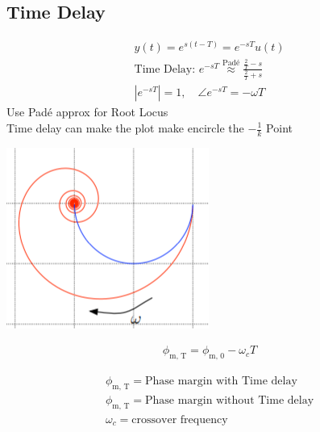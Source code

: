 \subsection{Time Delay}
    \begin{minipage}{0.59\linewidth}
        \begin{align*}
            y(t) = e^{s(t-T)} = e^{-sT} u(t)\\
            \text{Time Delay: } e^{-sT} \overset{\text{Padé}}{\approx} \frac{\frac{2}{T} - s}{\frac{2}{T} + s}\\
            |e^{-sT}| = 1, \quad \angle e^{-sT} = - \omega T
        \end{align*}
        Use Padé approx for Root Locus\\
        Time delay can make the plot make encircle the $-\frac{1}{k}$ Point
    \end{minipage}
    \begin{minipage}{0.39\linewidth}
        \includegraphics[width = \linewidth]{src/images/time_delay_nyquist.png}
    \end{minipage}
    \begin{minipage}{0.29\linewidth}
        \begin{align*}
            \phi_{\text{m, T}} = \phi_{\text{m, 0}} - \omega_c T
        \end{align*}
    \end{minipage}
    \begin{minipage}{0.69\linewidth}
        \begin{scriptsize}
            \begin{align*}
                \phi_{\text{m, T}} = \text{Phase margin with Time delay}\\
                \phi_{\text{m, T}} = \text{Phase margin without Time delay}\\
                \omega_c = \text{crossover frequency}
            \end{align*}
        \end{scriptsize}
    \end{minipage}